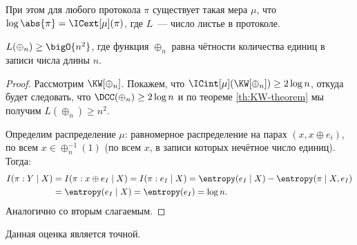 При этом  для любого протокола $\pi$ существует такая мера $\mu$, что $\log \abs{\pi} = \ICext[\mu](\pi)$,
где $L$~--- число листье в протоколе.

\begin{theorem}[Храпченко]
    $L(\oplus_n) \ge \bigO{n^2}$, где функция $\oplus_n$ равна чётности количества единиц в записи числа
    длины $n$.
\end{theorem}

\begin{proof}
    Рассмотрим $\KW[\oplus_n]$. Покажем, что $\ICint[\mu](\KW[\oplus_n]) \ge 2 \log n$, откуда будет
    следовать, что $\DCC(\oplus_n) \ge 2 \log n$ и по теореме \ref{th:KW-theorem} мы получим $L(\oplus_n)
    \ge n^2$.

    Определим распределение $\mu$: равномерное распределение на парах $(x, x \oplus e_i) $, по всем $x
    \in \oplus_n^{-1}(1)$ (по всем $x$, в записи которых нечётное число единиц). Тогда:
    \begin{align*}
        I(\pi : Y \mid X) &= I(\pi: x \oplus e_I \mid X) = I(\pi : e_I \mid X) = \entropy(e_I \mid X) -
                            \entropy(\pi \mid X, e_I) \\
        &= \entropy(e_I \mid X) = \entropy(e_I) = \log n.
    \end{align*}
    Аналогично со вторым слагаемым.
\end{proof}

Данная оценка является точной.
